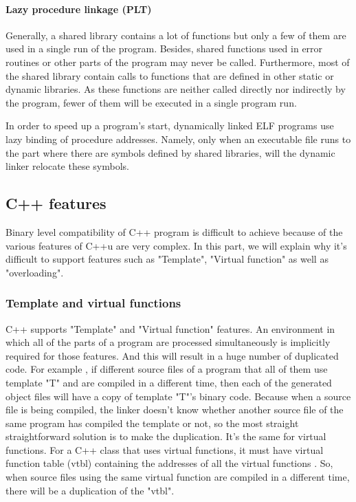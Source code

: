         
        \paragraph{Lazy procedure linkage (PLT)}
        Generally, a shared library contains a lot of functions but only a few of them are used in a single run of the program\cite{LAL-00}. Besides, shared functions used in error routines or other parts of the program may never be called\cite{LAL-00}. Furthermore, most of the shared library contain calls to functions that are defined in other static or dynamic libraries. As these functions are neither called directly nor indirectly by the program, fewer of them will be executed in a single program run\cite{LAL-00}.
                
        In order to speed up a program's start, dynamically linked ELF programs use lazy binding of procedure addresses\cite{LAL-00}. Namely, only when an executable file runs to the part where there are symbols defined by shared libraries, will the dynamic linker relocate these symbols.
        
        
        
    
    \subsection{C++ features}
        Binary level compatibility of C++ program is difficult to achieve because of the various features of C++u are very complex. In this part, we will explain why it's difficult to support features such as "Template", "Virtual function" as well as "overloading". 
        
        \subsubsection{Template and virtual functions}
        C++ supports "Template" and "Virtual function" features. An environment in which all of the parts of a program are processed simultaneously is implicitly required for those features\cite{LAL-00}. And this will result in a huge number of duplicated code. For example , if different source files of a program that all of them use template "T" and are compiled in a different time, then each of the generated object files will have a copy of template "T"'s binary code. Because when a source file is being compiled, the linker doesn't know whether another source file of the same program has compiled the template or not, so the most straight straightforward solution is to make the duplication. It's the same for virtual functions. For a C++ class that uses virtual functions, it must have virtual function table (vtbl) containing the addresses of all the virtual functions \cite{LAL-00}. So, when source files using the same virtual function are compiled in a different time, there will be a duplication of the "vtbl". 
        
